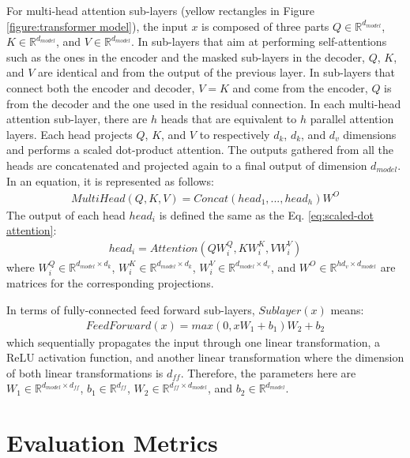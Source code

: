 For multi-head attention sub-layers (yellow rectangles in Figure \ref{figure:transformer model}), the input $ x $ is composed of three parts $ Q \in \mathbb{R}^{d_{model}} $, $ K \in \mathbb{R}^{d_{model}}$, and $ V \in \mathbb{R}^{d_{model}} $. In sub-layers that aim at performing self-attentions such as the ones in the encoder and the masked sub-layers in the decoder, $ Q $, $K$, and $V $ are identical and from the output of the previous layer. In sub-layers that connect both the encoder and decoder, $ V=K $ and come from the encoder, $ Q $ is from the decoder and the one used in the residual connection. In each multi-head attention sub-layer, there are $ h $ heads that are equivalent to $ h $ parallel attention layers. Each head projects $ Q $, $ K $, and $ V $ to respectively $ d_{k} $, $ d_{k} $, and $ d_{v} $ dimensions and performs a scaled dot-product attention. The outputs gathered from all the heads are concatenated and projected again to a final output of dimension $ d_{model} $. In an equation, it is represented as follows:
\begin{align*}
MultiHead(Q,K,V) = Concat(head_{1},...,head_{h})W^{O}
\end{align*}
The output of each head $ head_{i} $ is defined the same as the Eq. \ref{eq:scaled-dot attention}:
\begin{align*}
head_{i} = Attention(QW_{i}^{Q},KW_{i}^{K},VW_{i}^{V})
\end{align*}
where $ W_{i}^{Q} \in \mathbb{R}^{d_{model} \times d_{k}} $, $ W_{i}^{K} \in \mathbb{R}^{d_{model} \times d_{k}} $, $ W_{i}^{V} \in \mathbb{R}^{d_{model} \times d_{v}} $, and $ W^{O} \in \mathbb{R}^{hd_{v} \times d_{model}} $ are matrices for the corresponding projections.

In terms of fully-connected feed forward sub-layers, $ Sublayer(x) $ means:
\begin{align*}
FeedForward(x) = max(0,xW_{1}+b_{1})W_{2}+b_{2}
\end{align*}
which sequentially propagates the input through one linear transformation, a ReLU activation function, and another linear transformation where the dimension of both linear transformations is $ d_{ff} $. Therefore, the parameters here are $ W_{1} \in \mathbb{R}^{d_{model} \times d_{ff}} $, $ b_{1} \in \mathbb{R}^{d_{ff}} $, $ W_{2} \in \mathbb{R}^{d_{ff} \times d_{model}} $, and $ b_{2} \in \mathbb{R}^{d_{model}} $.

\section{Evaluation Metrics}

